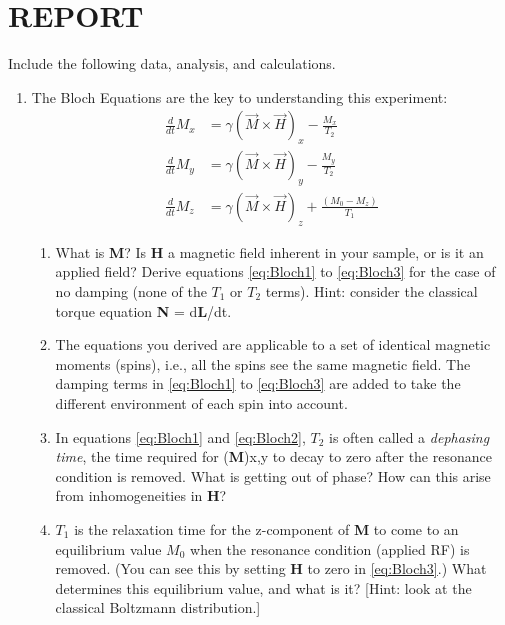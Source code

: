 \documentclass{../lab}
\begin{document}
\section{REPORT}

Include the following data, analysis, and calculations.

\begin{enumerate}
    \item The Bloch Equations are the key to understanding this experiment:
    \begin{align}
        \label{eq:Bloch1}
        \frac{d}{dt} M_x &= \gamma (\vec{M} \times \vec{H})_x - \frac{M_x}{T_2} \\
        \label{eq:Bloch2}
        \frac{d}{dt} M_y &= \gamma (\vec{M} \times \vec{H})_y - \frac{M_y}{T_2} \\
        \label{eq:Bloch3}
        \frac{d}{dt} M_z &= \gamma (\vec{M} \times \vec{H})_z + \frac{(M_0 - M_z)}{T_1} 
    \end{align}

    \begin{enumerate}
        \item What is \textbf{M}? Is\textbf{ H} a magnetic field inherent in your sample, or is it an applied field? Derive equations \eqref{eq:Bloch1} to \eqref{eq:Bloch3} for the case of no damping (none of the $T_1$ or $T_2$ terms). Hint: consider the classical torque equation \textbf{N} = d\textbf{L}/dt.

        \item The equations you derived are applicable to a set of identical magnetic moments (spins), i.e., all the spins see the same magnetic field. The damping terms in \eqref{eq:Bloch1} to \eqref{eq:Bloch3} are added to take the different environment of each spin into account.

        \item In equations \eqref{eq:Bloch1} and \eqref{eq:Bloch2}, $T_2$ is often called a \emph{dephasing time}, the time required for (\textbf{M})x,y to decay to zero after the resonance condition is removed. What is getting out of phase? How can this arise from inhomogeneities in \textbf{H}?

        \item $T_1$ is the relaxation time for the z-component of \textbf{M} to come to an equilibrium value $M_0$ when the resonance condition (applied RF) is removed. (You can see this by setting \textbf{H} to zero in \eqref{eq:Bloch3}.) What determines this equilibrium value, and what is it? [Hint: look at the classical Boltzmann distribution.]


\end{enumerate}
\end{enumerate}
\end{document}
